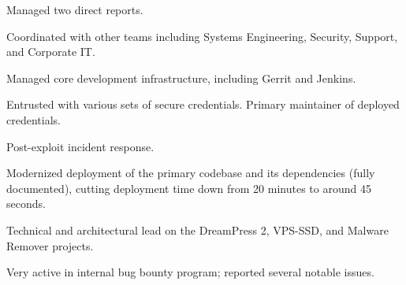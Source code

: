 \item Managed two direct reports.
\item Coordinated with other teams including Systems Engineering, Security, Support, and Corporate IT.
\item Managed core development infrastructure, including Gerrit and Jenkins.
\item Entrusted with various sets of secure credentials. Primary maintainer of deployed credentials.
\item Post-exploit incident response.
\item Modernized deployment of the primary codebase and its dependencies (fully documented), cutting deployment time down from 20 minutes to around 45 seconds.
\item Technical and architectural lead on the DreamPress 2, VPS-SSD, and Malware Remover projects.
\item Very active in internal bug bounty program; reported several notable issues.
